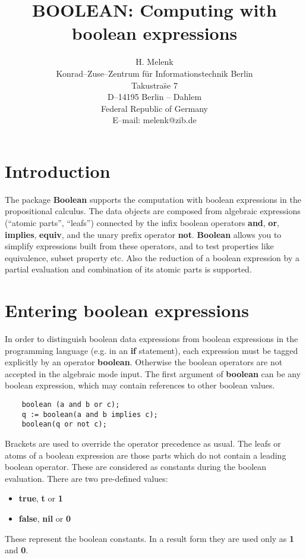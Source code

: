 \title{BOOLEAN: Computing with boolean expressions}
\date{}
\author{
H. Melenk\\[0.05in]
Konrad--Zuse--Zentrum f\"ur Informationstechnik Berlin \\
Takustra\"se 7 \\
D--14195 Berlin -- Dahlem \\
Federal Republic of Germany \\[0.05in]
E--mail: melenk@zib.de \\[0.05in]
}


\maketitle

\section{Introduction}

The package {\bf Boolean} supports the computation with
boolean expressions in the propositional calculus.
The data objects are composed from algebraic expressions (``atomic parts'', ``leafs'')
connected by the infix boolean operators {\bf and}, {\bf or}, 
{\bf implies}, {\bf equiv}, and the unary prefix operator
{\bf not}. {\bf Boolean} allows you to simplify expressions
built from these operators, and to test properties like
equivalence, subset property etc. Also the reduction of
a boolean expression by a partial evaluation and combination
of its atomic parts is supported.

\section{Entering boolean expressions}

In order to distinguish boolean data expressions from 
boolean expressions in the \REDUCE programming
language (e.g. in an {\bf if} statement), each expression
must be tagged explicitly by an operator {\bf boolean}.
Otherwise the boolean operators are not accepted in the
\REDUCE  algebraic mode input.
The first argument of {\bf boolean} can be any boolean expression,
which may contain references to other boolean values.
\begin{verbatim}
    boolean (a and b or c);
    q := boolean(a and b implies c);
    boolean(q or not c);
\end{verbatim}
Brackets are used to override the operator precedence as usual.
The leafs or atoms of a boolean expression are those parts which
do not contain a leading boolean operator. These are
considered as constants during the boolean evaluation. There
are two pre-defined values:
\begin{itemize}
\item {\bf true}, {\bf t} or {\bf 1}
\item {\bf false}, {\bf nil} or {\bf 0}
\end{itemize}
These represent the boolean constants. In a result
form they are used only as {\bf 1} and {\bf 0}.

